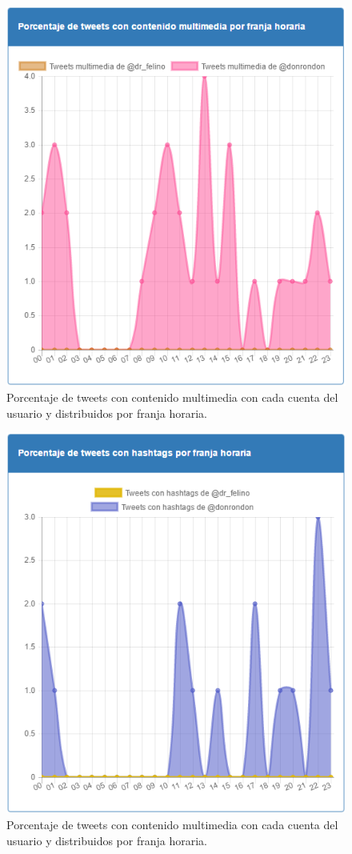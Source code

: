 \documentclass[a4paper]{article}
\begin{document}
			\begin{figure}[H]
				\centering
				\includegraphics[width=0.6\linewidth]{img/tweetsMultimedia}
				\caption{Porcentaje de tweets con contenido multimedia con cada cuenta del usuario y distribuidos por franja horaria.}
				\label{fig:tweetsMultimedia}
			\end{figure}
			
			\begin{figure}[H]
				\centering
				\includegraphics[width=0.6\linewidth]{img/hashtagsHoras}
				\caption{Porcentaje de tweets con contenido multimedia con cada cuenta del usuario y distribuidos por franja horaria.}
				\label{fig:hashtagsHoras}
			\end{figure}
			
\end{document}
